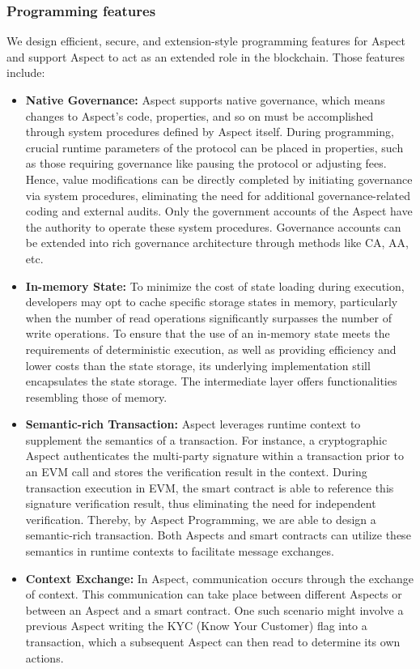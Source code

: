 \subsubsection{Programming features}

We design efficient, secure, and extension-style programming features for Aspect and support Aspect to act as an extended role in the blockchain. Those features include:

\begin{itemize}
  \item \textbf{Native Governance:} Aspect supports native governance, which means changes to Aspect's code, properties, and so on must be accomplished through system procedures defined by Aspect itself. During programming, crucial runtime parameters of the protocol can be placed in properties, such as those requiring governance like pausing the protocol or adjusting fees. Hence, value modifications can be directly completed by initiating governance via system procedures, eliminating the need for additional governance-related coding and external audits. Only the government accounts of the Aspect have the authority to operate these system procedures. Governance accounts can be extended into rich governance architecture through methods like CA, AA, etc. 
  \item \textbf{In-memory State:} To minimize the cost of state loading during execution, developers may opt to cache specific storage states in memory, particularly when the number of read operations significantly surpasses the number of write operations. To ensure that the use of an in-memory state meets the requirements of deterministic execution, as well as providing efficiency and lower costs than the state storage, its underlying implementation still encapsulates the state storage. The intermediate layer offers functionalities resembling those of memory.
  \item \textbf{Semantic-rich Transaction:} Aspect leverages runtime context to supplement the semantics of a transaction. For instance, a cryptographic Aspect authenticates the multi-party signature within a transaction prior to an EVM call and stores the verification result in the context. During transaction execution in EVM, the smart contract is able to reference this signature verification result, thus eliminating the need for independent verification. Thereby, by Aspect Programming, we are able to design a semantic-rich transaction. Both Aspects and smart contracts can utilize these semantics in runtime contexts to facilitate message exchanges.
  \item \textbf{Context Exchange:} In Aspect, communication occurs through the exchange of context. This communication can take place between different Aspects or between an Aspect and a smart contract. One such scenario might involve a previous Aspect writing the KYC (Know Your Customer) flag into a transaction, which a subsequent Aspect can then read to determine its own actions.
\end{itemize}

